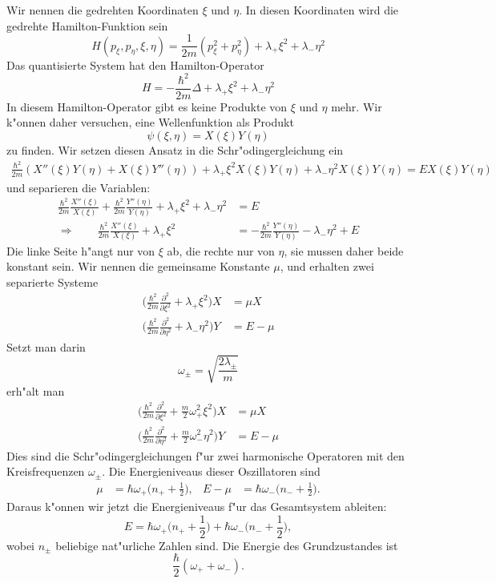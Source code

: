 \begin{loesung}
Wir nennen die gedrehten Koordinaten $\xi$ und $\eta$.
In diesen Koordinaten wird die gedrehte Hamilton-Funktion sein
\[
H(p_\xi,p_\eta,\xi,\eta)
=
\frac1{2m}(p_\xi^2+p_\eta^2)+\lambda_+\xi^2+\lambda_-\eta^2
\]
Das quantisierte System hat den Hamilton-Operator
\[
H
=
-\frac{\hbar^2}{2m}\Delta + \lambda_+\xi^2+\lambda_-\eta^2
\]
In diesem Hamilton-Operator gibt es keine Produkte von $\xi$ und $\eta$ mehr.
Wir k"onnen daher versuchen, eine Wellenfunktion als Produkt 
\[
\psi(\xi,\eta)=X(\xi)Y(\eta)
\]
zu finden. Wir setzen diesen Ansatz in die Schr"odingergleichung ein
\begin{align*}
\frac{\hbar^2}{2m}(X''(\xi)Y(\eta)+X(\xi)Y''(\eta))
+\lambda_+\xi^2X(\xi)Y(\eta)+\lambda_-\eta^2X(\xi)Y(\eta)=EX(\xi)Y(\eta)
\end{align*}
und separieren die Variablen:
\begin{align*}
\frac{\hbar^2}{2m}\frac{X''(\xi)}{X(\xi)}
+
\frac{\hbar^2}{2m}\frac{Y''(\eta)}{Y(\eta)}
+
\lambda_+\xi^2+\lambda_-\eta^2&=E
\\
\Rightarrow\qquad
\frac{\hbar^2}{2m}\frac{X''(\xi)}{X(\xi)}
+\lambda_+\xi^2
&=
-\frac{\hbar^2}{2m}\frac{Y''(\eta)}{Y(\eta)}
-\lambda_-\eta^2
+E
\end{align*}
Die linke Seite h"angt nur von $\xi$ ab, die rechte nur von $\eta$,
sie mussen daher beide konstant sein.
Wir nennen die gemeinsame Konstante $\mu$, und erhalten zwei
separierte Systeme
\begin{align*}
\biggl(
\frac{\hbar^2}{2m}\frac{\partial^2}{\partial\xi^2}+\lambda_+\xi^2
\biggr)X&=\mu X
\\
\biggl(
\frac{\hbar^2}{2m}\frac{\partial^2}{\partial\eta^2}+\lambda_-\eta^2
\biggr)Y
&=E-\mu
\end{align*}
Setzt man darin
\[
\omega_\pm=\sqrt{\frac{2\lambda_\pm}{m}}
\]
erh"alt man 
\begin{align*}
\biggl(
\frac{\hbar^2}{2m}\frac{\partial^2}{\partial\xi^2}+\frac{m}2\omega_+^2\xi^2
\biggr)X&=\mu X
\\
\biggl(
\frac{\hbar^2}{2m}\frac{\partial^2}{\partial\eta^2}+\frac{m}2\omega_-^2\eta^2
\biggr)Y
&=E-\mu
\end{align*}
Dies sind die Schr"odingergleichungen f"ur zwei harmonische Operatoren
mit den Kreisfrequenzen $\omega_\pm$.
Die Energieniveaus dieser Oszillatoren sind
\begin{align*}
\mu
&=
\hbar\omega_+\biggl(n_++\frac12\biggr),
&
E-\mu&=
\hbar\omega_-\biggl(n_-+\frac12\biggr).
\end{align*}
Daraus k"onnen wir jetzt die Energieniveaus f"ur das Gesamtsystem ableiten:
\[
E=
\hbar\omega_+\biggl(n_++\frac12\biggr)
+
\hbar\omega_-\biggl(n_-+\frac12\biggr),
\]
wobei $n_\pm$ beliebige nat"urliche Zahlen sind.
Die Energie des Grundzustandes ist
\[
\frac{\hbar}2(\omega_++\omega_-).
\]
\end{loesung}


